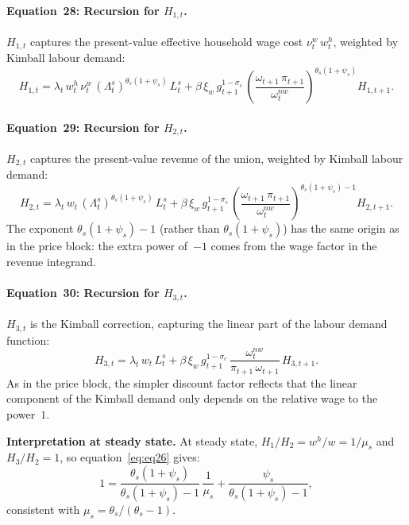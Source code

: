 \documentclass[11pt,a4paper]{article}
\begin{document}
\paragraph{Equation~28: Recursion for $H_{1,t}$.}
$H_{1,t}$ captures the present-value effective household wage cost
$\nu^w_t\,w^h_t$, weighted by Kimball labour demand:
\begin{equation}\label{eq:eq28}\tag{Eq.~28}
  \boxed{
  H_{1,t} = \lambda_t\,w^h_t\,\nu^w_t\,(\Lambda^s_t)^{\theta_s(1+\psi_s)}\,L^s_t
  + \beta\,\xi_w\,g_{t+1}^{1-\sigma_c}\,
    \left(\frac{\omega_{t+1}\,\pi_{t+1}}{\omega^{nw}_t}\right)^{\!\theta_s(1+\psi_s)}
    \!H_{1,t+1}.}
\end{equation}

\paragraph{Equation~29: Recursion for $H_{2,t}$.}
$H_{2,t}$ captures the present-value revenue of the union, weighted
by Kimball labour demand:
\begin{equation}\label{eq:eq29}\tag{Eq.~29}
  \boxed{
  H_{2,t} = \lambda_t\,w_t\,
    (\Lambda^s_t)^{\theta_s(1+\psi_s)}\,L^s_t
  + \beta\,\xi_w\,g_{t+1}^{1-\sigma_c}\,
    \left(\frac{\omega_{t+1}\,\pi_{t+1}}{\omega^{nw}_t}\right)^{\!\theta_s(1+\psi_s)-1}
    \!H_{2,t+1}.}
\end{equation}
The exponent $\theta_s(1+\psi_s)-1$ (rather than $\theta_s(1+\psi_s)$)
has the same origin as in the price block: the extra power of~$-1$ comes
from the wage factor in the revenue integrand.

\paragraph{Equation~30: Recursion for $H_{3,t}$.}
$H_{3,t}$ is the Kimball correction, capturing the linear part of the
labour demand function:
\begin{equation}\label{eq:eq30}\tag{Eq.~30}
  \boxed{
  H_{3,t} = \lambda_t\,w_t\,L^s_t
  + \beta\,\xi_w\,g_{t+1}^{1-\sigma_c}\,
    \frac{\omega^{nw}_t}{\pi_{t+1}\,\omega_{t+1}}\,H_{3,t+1}.}
\end{equation}
As in the price block, the simpler discount factor reflects that the
linear component of the Kimball demand only depends on the relative wage
to the power~$1$.

\medskip
\noindent\textbf{Interpretation at steady state.}
At steady state, $H_1/H_2 = w^h/w = 1/\mu_s$ and $H_3/H_2 = 1$, so
equation~\eqref{eq:eq26} gives:
\[
  1 = \frac{\theta_s(1+\psi_s)}{\theta_s(1+\psi_s)-1}\,\frac{1}{\mu_s}
  + \frac{\psi_s}{\theta_s(1+\psi_s)-1},
\]
consistent with $\mu_s = \theta_s/(\theta_s - 1)$.
\end{document}
